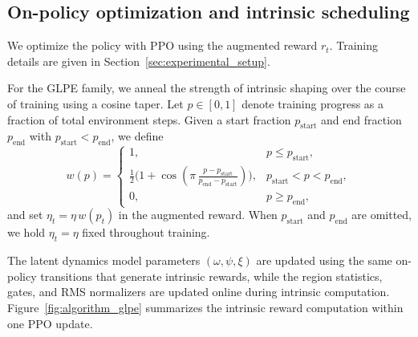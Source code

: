 \subsection{On-policy optimization and intrinsic scheduling}

We optimize the policy with PPO using the augmented reward $r_t$.
Training details are given in Section~\ref{sec:experimental_setup}.

For the GLPE family, we anneal the strength of intrinsic shaping over the course of training using a cosine taper.
Let $p\in[0,1]$ denote training progress as a fraction of total environment steps.
Given a start fraction $p_{\mathrm{start}}$ and end fraction $p_{\mathrm{end}}$ with $p_{\mathrm{start}}<p_{\mathrm{end}}$, we define
\begin{equation}
    w(p) =
    \begin{cases}
        1, & p \le p_{\mathrm{start}},\\
        \tfrac{1}{2}\big(1+\cos(\pi\,\tfrac{p-p_{\mathrm{start}}}{p_{\mathrm{end}}-p_{\mathrm{start}}})\big), & p_{\mathrm{start}}<p<p_{\mathrm{end}},\\
        0, & p \ge p_{\mathrm{end}},
    \end{cases}
\end{equation}
and set $\eta_t=\eta\,w(p_t)$ in the augmented reward.
When $p_{\mathrm{start}}$ and $p_{\mathrm{end}}$ are omitted, we hold $\eta_t=\eta$ fixed throughout training.

The latent dynamics model parameters $(\omega,\psi,\xi)$ are updated using the same on-policy transitions that generate intrinsic rewards, while the region statistics, gates, and RMS normalizers are updated online during intrinsic computation.
Figure~\ref{fig:algorithm_glpe} summarizes the intrinsic reward computation within one PPO update.


